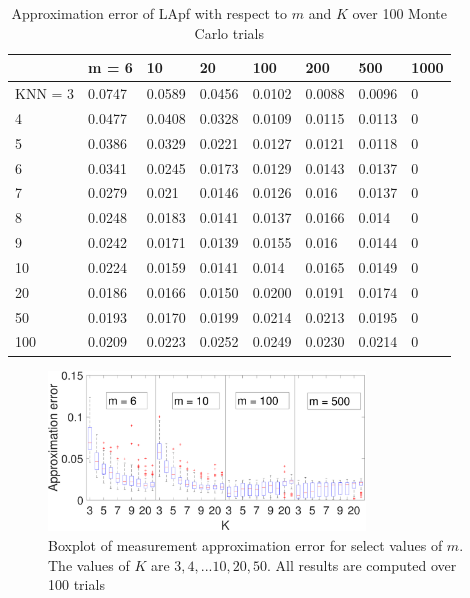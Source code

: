 \documentclass[10pt,letterpaper,final]{article}
\begin{document}
\begin{table}[h!]
\centering
\begin{tabular}{|l|l|l|l|l|l|l|l|}
\hline
        & m = 6  & 10     & 20     & 100    & 200    & 500    & 1000 \\ \hline
KNN = 3 & 0.0747 & 0.0589 & 0.0456 & 0.0102 & 0.0088 & 0.0096 & 0    \\ \hline
4       & 0.0477 & 0.0408 & 0.0328 & 0.0109 & 0.0115 & 0.0113 & 0    \\ \hline
5       & 0.0386 & 0.0329 & 0.0221 & 0.0127 & 0.0121 & 0.0118 & 0    \\ \hline
6       & 0.0341 & 0.0245 & 0.0173 & 0.0129 & 0.0143 & 0.0137 & 0    \\ \hline
7       & 0.0279 & 0.021  & 0.0146 & 0.0126 & 0.016  & 0.0137 & 0    \\ \hline
8       & 0.0248 & 0.0183 & 0.0141 & 0.0137 & 0.0166 & 0.014  & 0    \\ \hline
9       & 0.0242 & 0.0171 & 0.0139 & 0.0155 & 0.016  & 0.0144 & 0    \\ \hline
10      & 0.0224 & 0.0159 & 0.0141 & 0.014  & 0.0165 & 0.0149 & 0    \\ \hline
20      & 0.0186 & 0.0166 & 0.0150 & 0.0200 & 0.0191 & 0.0174         & 0    \\ \hline
50      & 0.0193 & 0.0170 & 0.0199 & 0.0214 & 0.0213 & 0.0195         & 0    \\ \hline
100     & 0.0209 & 0.0223 & 0.0252 & 0.0249 & 0.0230 & 0.0214         & 0 \\ \hline
\end{tabular}
\caption{Approximation error of LApf with respect to $m$ and $K$ over 100 Monte Carlo trials}
\label{tab:Approx_error_LApf}
\end{table}

\begin{figure}
\centering
\includegraphics[width=0.75\textwidth]{Figures/Approx_error_LApf_boxplot}
\caption{Boxplot of measurement approximation error for select values of $m$. The values of $K$ are $3,4,...10,20,50 $. All results are computed over 100 trials}
\label{fig:Approx_error_LApf_boxplot}
\end{figure}
\end{document}
